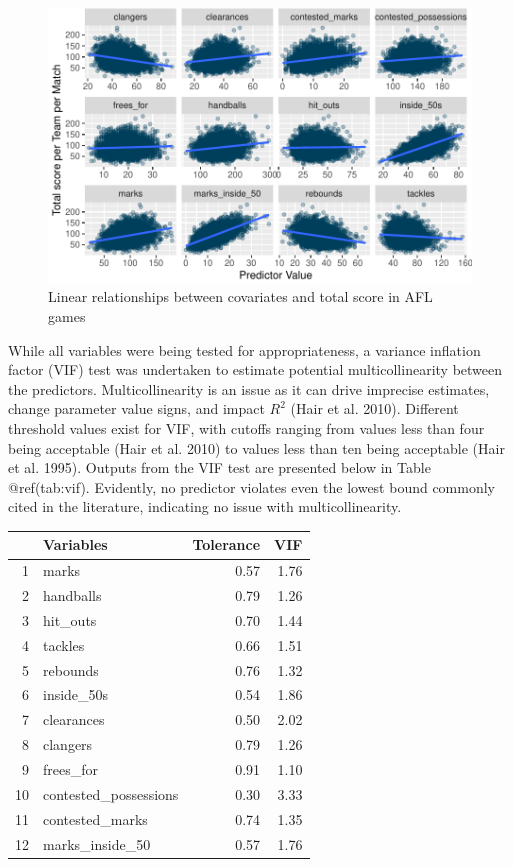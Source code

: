 \documentclass{article}
\begin{document}
\begin{figure}
\centering
\includegraphics{OLET5608_TrentHenderson_files/figure-latex/unnamed-chunk-4-1.pdf}
\caption{Linear relationships between covariates and total score in AFL
games}
\end{figure}

While all variables were being tested for appropriateness, a variance
inflation factor (VIF) test was undertaken to estimate potential
multicollinearity between the predictors. Multicollinearity is an issue
as it can drive imprecise estimates, change parameter value signs, and
impact \(R^2\) (Hair et al. 2010). Different threshold values exist for
VIF, with cutoffs ranging from values less than four being acceptable
(Hair et al. 2010) to values less than ten being acceptable (Hair et al.
1995). Outputs from the VIF test are presented below in Table
@ref(tab:vif). Evidently, no predictor violates even the lowest bound
commonly cited in the literature, indicating no issue with
multicollinearity.

\begin{table}[ht]
\centering
\begin{tabular}{rlrr}
  \hline
 & Variables & Tolerance & VIF \\ 
  \hline
1 & marks & 0.57 & 1.76 \\ 
  2 & handballs & 0.79 & 1.26 \\ 
  3 & hit\_outs & 0.70 & 1.44 \\ 
  4 & tackles & 0.66 & 1.51 \\ 
  5 & rebounds & 0.76 & 1.32 \\ 
  6 & inside\_50s & 0.54 & 1.86 \\ 
  7 & clearances & 0.50 & 2.02 \\ 
  8 & clangers & 0.79 & 1.26 \\ 
  9 & frees\_for & 0.91 & 1.10 \\ 
  10 & contested\_possessions & 0.30 & 3.33 \\ 
  11 & contested\_marks & 0.74 & 1.35 \\ 
  12 & marks\_inside\_50 & 0.57 & 1.76 \\ 
   \hline
\end{tabular}
\end{table}
\end{document}
